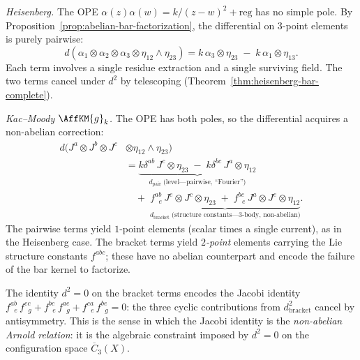 \begin{example}
\label{ex:heisenberg-vs-km}

\emph{Heisenberg.}
The OPE $\alpha(z)\alpha(w) = k/(z{-}w)^2 + \mathrm{reg}$ has no
simple pole.  By Proposition~\ref{prop:abelian-bar-factorization},
the differential on $3$-point elements is purely pairwise:
\[
d(\alpha_1 \otimes \alpha_2 \otimes \alpha_3
  \otimes \eta_{12} \wedge \eta_{23})
= k\, \alpha_3 \otimes \eta_{23}
  \;-\; k\, \alpha_1 \otimes \eta_{13}.
\]
Each term involves a single residue extraction and a single
surviving field.  The two terms cancel under $d^2$ by telescoping
(Theorem~\ref{thm:heisenberg-bar-complete}).

\emph{Kac--Moody $\AffKM{g}_k$.}
The OPE has both poles, so the differential acquires a non-abelian
correction:
\begin{align*}
d(J^a \otimes J^b \otimes J^c
  &\otimes \eta_{12} \wedge \eta_{23}) \\
&= \underbrace{k\delta^{ab}\, J^c \otimes \eta_{23}
  \;-\; k\delta^{bc}\, J^a
  \otimes \eta_{12}}_{\displaystyle
  d_{\mathrm{pair}}\;\text{(level---pairwise, ``Fourier'')}} \\
&\quad+\; \underbrace{f^{ab}_{\;\;e}\, J^e \otimes J^c
  \otimes \eta_{23}
  \;+\; f^{bc}_{\;\;e}\, J^a \otimes J^e
  \otimes \eta_{12}}_{\displaystyle
  d_{\mathrm{bracket}}\;\text{(structure
  constants---$3$-body, non-abelian)}}.
\end{align*}
The pairwise terms yield $1$-point elements (scalar times a single
current), as in the Heisenberg case.  The bracket terms yield
\emph{$2$-point} elements carrying the Lie structure constants
$f^{abc}$; these have no abelian counterpart and encode the failure
of the bar kernel to factorize.

The identity $d^2 = 0$ on the bracket terms encodes the Jacobi
identity
$f^{ab}_{\;\;e}\, f^{ec}_{\;\;g}
+ f^{bc}_{\;\;e}\, f^{ae}_{\;\;g}
+ f^{ca}_{\;\;e}\, f^{be}_{\;\;g} = 0$:
the three cyclic contributions from $d_{\mathrm{bracket}}^2$ cancel
by antisymmetry.  This is the sense in which the Jacobi identity is
the \emph{non-abelian Arnold relation}: it is the algebraic
constraint imposed by $d^2 = 0$ on the configuration space
$\overline{C}_3(X)$.
\end{example}

